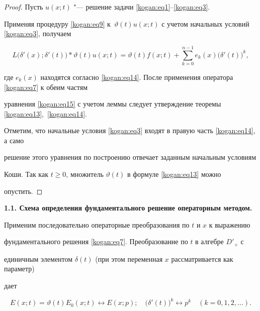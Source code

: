 \begin{proof}

Пусть $u(x;t)$ "--- решение задачи \eqref{kogan:eq1}--\eqref{kogan:eq3}. 

Применяя процедуру \eqref{kogan:eq9} к~$\vartheta (t)u(x;t)$ с учетом начальных условий \eqref{kogan:eq3}, получаем

\begin{equation}

\label{kogan:eq15}

L\big(\delta'(x);\delta'(t) \big) \ast \vartheta (t)u(x;t)=\vartheta 

(t)f(x;t)+\sum\limits_{k=0}^{n-1} e_k (x)\big(\delta'(t) \big)^k,

\end{equation}

где $e_k (x)$ находятся согласно \eqref{kogan:eq14}. После применения оператора \eqref{kogan:eq7} к обеим частям 

уравнения \eqref{kogan:eq15} с учетом леммы следует утверждение теоремы \eqref{kogan:eq13},~\eqref{kogan:eq14}. 



Отметим, что начальные условия \eqref{kogan:eq3} входят в правую часть \eqref{kogan:eq14}, а само 

решение этого уравнения по построению отвечает заданным начальным условиям 

Коши. Так как $t\ge 0$,  множитель $\vartheta (t)$ в формуле \eqref{kogan:eq13} можно 

опустить.

\end{proof}



\smallskip



{\bf 1.1. Схема определения фундаментального решение операторным методом.}

Применим последовательно операторные преобразования по $t$ и $x$ к выражению 

фундаментального решения \eqref{kogan:eq7}. Преобразование по $t$ в алгебре $D'_+$ с 

единичным элементом $\delta (t)$ (при этом переменная $x$ рассматривается как параметр) 

дает 

\begin{equation}

\label{kogan:eq16}

E(x;t)=\vartheta (t)E_0 (x;t)\leftrightarrow E(x;p);

\quad

\big(\delta'(t) \big)^k \leftrightarrow p^k \quad (k=0,1,2,\ldots).

\end{equation}



